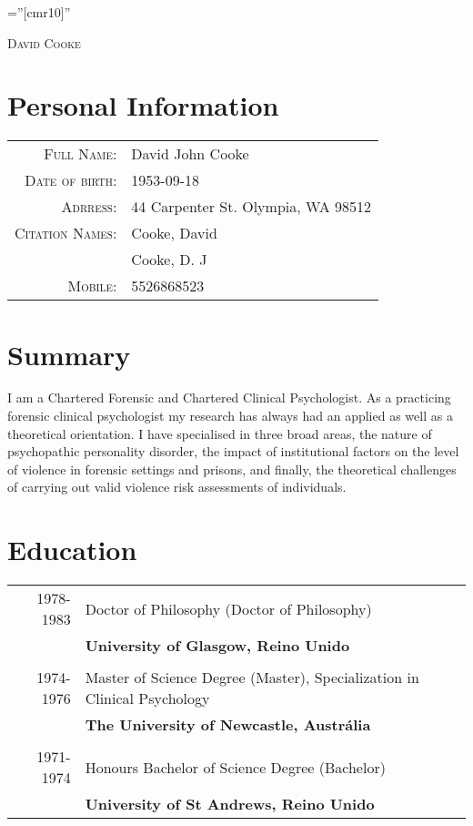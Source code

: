 \documentclass [a4paper,10pt]{article}
\begin{document}
\pagestyle{empty} %

\font\fb=''[cmr10]'' %

\par{\centering
		{\Huge   \textsc{David Cooke}
	}\bigskip\par}


\section{Personal Information}

\begin{tabular}{rl}
    \textsc{Full Name:} & David John Cooke \\
    \textsc{Date of birth:} & 1953-09-18 \\
    \textsc{Adrress:}   & 44 Carpenter St.
    Olympia, WA 98512\\
    \textsc{Citation Names:}   & Cooke, David \\ & Cooke, D. J \\ 
    \textsc{Mobile:}     & 5526868523\\
\end{tabular}

\section{Summary}
I am a Chartered Forensic and Chartered Clinical Psychologist. As a practicing forensic clinical psychologist my research has always had an applied as well as a theoretical orientation. I have specialised in three broad areas, the nature of psychopathic personality disorder, the impact of institutional factors on the level of violence in forensic settings and prisons, and finally, the theoretical challenges of carrying out valid violence risk assessments of individuals. 

\section{Education}
\begin{tabular}{r p{11cm}}	
\\
\textsc{1978-1983} & Doctor of Philosophy (Doctor of Philosophy) \\ & \textbf{University of Glasgow, Reino Unido}\\
\\\textsc{1974-1976} & Master of Science Degree (Master), Specialization in Clinical Psychology  \\ & \textbf{The University of Newcastle, Austrália}\\
\\\textsc{1971-1974} & Honours Bachelor of Science Degree (Bachelor) \\ & \textbf{University of St Andrews, Reino Unido}\\

\end{tabular}
\end{document}
